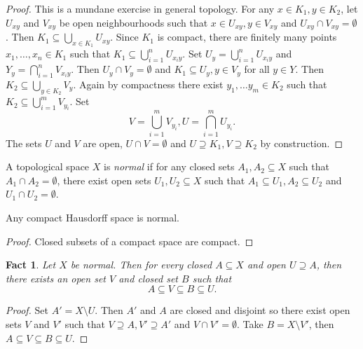 \documentclass[a4paper]{article}
\newtheorem*{fact}{Fact}
\begin{document}
\begin{proof}
  This is a mundane exercise in general topology. For any \(x \in K_1, y \in K_2\), let \(U_{xy}\) and \(V_{xy}\) be open neighbourhoods such that \(x \in U_{xy}, y \in V_{xy}\) and \(U_{xy} \cap V_{xy} = \emptyset\). Then \(K_1 \subseteq \bigcup_{x \in K_1} U_{xy}\). Since \(K_1\) is compact, there are finitely many points \(x_1, \dots, x_n \in K_1\) such that \(K_1 \subseteq \bigcup_{i = 1}^n U_{x_iy}\). Set \(U_y = \bigcup_{i = 1}^n U_{x_iy}\) and \(Y_y = \bigcap_{i = 1}^n V_{x_iy}\). Then \(U_y \cap V_y = \emptyset\) and \(K_1 \subseteq U_y, y \in V_y\) for all \(y \in Y\). Then \(K_2 \subseteq \bigcup_{y \in K_2} V_y\). Again by compactness there exist \(y_1, \dots y_m \in K_2\) such that \(K_2 \subseteq \bigcup_{i = 1}^m V_{y_i}\). Set
  \[
    V = \bigcup_{i = 1}^m V_{y_i}, U = \bigcap_{i = 1}^m U_{y_i}.
  \]
  The sets \(U\) and \(V\) are open, \(U \cap V = \emptyset\) and \(U \supseteq K_1, V \supseteq K_2\) by construction.
\end{proof}

\begin{definition}[normal]
  A topological space \(X\) is \emph{normal} if for any closed sets \(A_1, A_2 \subseteq X\) such that \(A_1 \cap A_2 = \emptyset\), there exist open sets \(U_1, U_2 \subseteq X\) such that \(A_1 \subseteq U_1, A_2 \subseteq U_2\) and \(U_1 \cap U_2 = \emptyset\).
\end{definition}

\begin{corollary}
  Any compact Hausdorff space is normal.
\end{corollary}

\begin{proof}
  Closed subsets of a compact space are compact.
\end{proof}

\begin{fact}
  Let \(X\) be normal. Then for every closed \(A \subseteq X\) and open \(U \supseteq A\), then there exists an open set \(V\) and closed set \(B\) such that
  \[
    A \subseteq V \subseteq B \subseteq U.
  \]
\end{fact}

\begin{proof}
  Set \(A' = X \setminus U\). Then \(A'\) and \(A\) are closed and disjoint so there exist open sets \(V\) and \(V'\) such that \(V \supseteq A, V' \supseteq A'\) and \(V \cap V' = \emptyset\). Take \(B = X \setminus V'\), then \(A \subseteq V \subseteq B \subseteq U\).
\end{proof}
\end{document}
